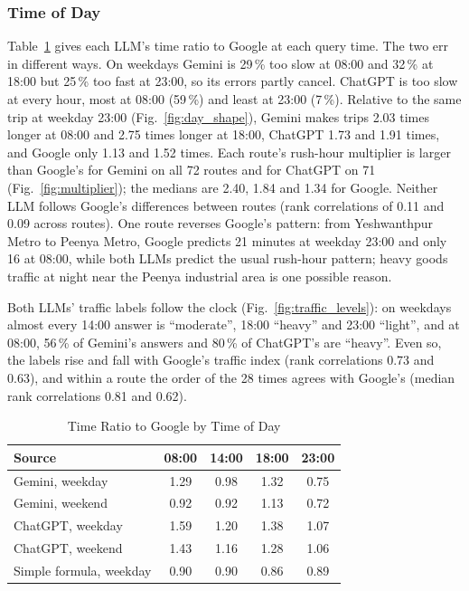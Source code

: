 \documentclass[conference]{IEEEtran}
\begin{document}
\subsubsection{Time of Day}
Table~\ref{tab:time_ratio} gives each LLM's time ratio to Google at each query time. The two err in different ways. On weekdays Gemini is 29\,\% too slow at 08:00 and 32\,\% at 18:00 but 25\,\% too fast at 23:00, so its errors partly cancel. ChatGPT is too slow at every hour, most at 08:00 (59\,\%) and least at 23:00 (7\,\%). Relative to the same trip at weekday 23:00 (Fig.~\ref{fig:day_shape}), Gemini makes trips 2.03 times longer at 08:00 and 2.75 times longer at 18:00, ChatGPT 1.73 and 1.91 times, and Google only 1.13 and 1.52 times. Each route's rush-hour multiplier is larger than Google's for Gemini on all 72 routes and for ChatGPT on 71 (Fig.~\ref{fig:multiplier}); the medians are 2.40, 1.84 and 1.34 for Google. Neither LLM follows Google's differences between routes (rank correlations of 0.11 and 0.09 across routes). One route reverses Google's pattern: from Yeshwanthpur Metro to Peenya Metro, Google predicts 21 minutes at weekday 23:00 and only 16 at 08:00, while both LLMs predict the usual rush-hour pattern; heavy goods traffic at night near the Peenya industrial area is one possible reason.

Both LLMs' traffic labels follow the clock (Fig.~\ref{fig:traffic_levels}): on weekdays almost every 14:00 answer is ``moderate'', 18:00 ``heavy'' and 23:00 ``light'', and at 08:00, 56\,\% of Gemini's answers and 80\,\% of ChatGPT's are ``heavy''. Even so, the labels rise and fall with Google's traffic index (rank correlations 0.73 and 0.63), and within a route the order of the 28 times agrees with Google's (median rank correlations 0.81 and 0.62).

\begin{table}[!htb]
\caption{Time Ratio to Google by Time of Day}
\label{tab:time_ratio}
\centering
\begin{tabular}{lcccc}
\hline
Source & 08:00 & 14:00 & 18:00 & 23:00 \\
\hline
Gemini, weekday & 1.29 & 0.98 & 1.32 & 0.75 \\
Gemini, weekend & 0.92 & 0.92 & 1.13 & 0.72 \\
ChatGPT, weekday & 1.59 & 1.20 & 1.38 & 1.07 \\
ChatGPT, weekend & 1.43 & 1.16 & 1.28 & 1.06 \\
Simple formula, weekday & 0.90 & 0.90 & 0.86 & 0.89 \\
\hline
\end{tabular}
\end{table}
\end{document}
